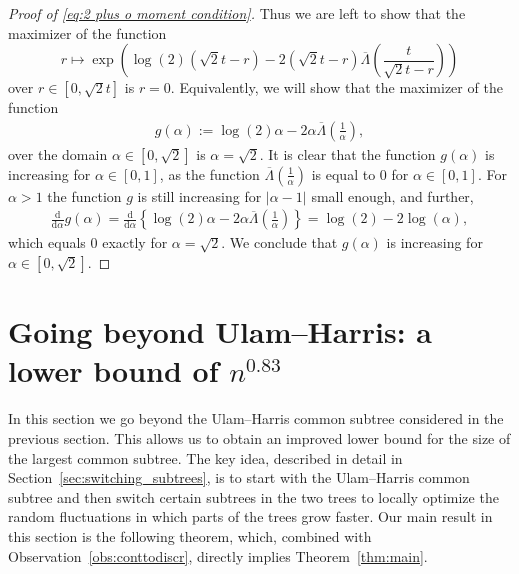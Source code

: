 \documentclass[11pt]{article}
\numberwithin{equation}{section}
\newcommand{\dd}{\mathrm d}
\theoremstyle{definition}
\begin{document}
\begin{proof}[Proof of \eqref{eq:2 plus o moment condition}]
Thus we are left to show that the maximizer of the function 
\[
r \mapsto    \exp \left( \log(2) (\sqrt{2}t-r) - 2 (\sqrt{2}t-r) \overline{\Lambda}\left( \frac{t}{\sqrt{2}t - r} \right) \right)
\] 
over $r \in \left[0,\sqrt{2}t\right]$ is $r = 0$.
Equivalently, we will show that the maximizer of the function 
    \begin{align*}
        g(\alpha) := \log(2) \alpha - 2 \alpha \overline{\Lambda}\left( \frac{1}{\alpha} \right) ,
    \end{align*}
    over the domain $\alpha \in \left[ 0, \sqrt{2} \right]$ is $\alpha = \sqrt{2}$. It is clear that the function $g(\alpha)$ is increasing for $\alpha \in [0,1]$, as the function $\overline{\Lambda}\left( \tfrac{1}{\alpha} \right) $ is equal to $0$ for $\alpha \in [0,1]$. For $\alpha > 1$ the function $g$ is still increasing for $|\alpha-1|$ small enough, and further,
    \begin{align*}
        \frac{\dd}{\dd \alpha}g(\alpha) = \frac{\dd}{\dd \alpha} \left\{ \log(2)\alpha -2 \alpha \overline{\Lambda} \left( \frac{1}{\alpha} \right) \right\}
        = \log(2) - 2 \log(\alpha),
    \end{align*}
    which equals $0$ exactly for $\alpha = \sqrt{2}$. We conclude that $g(\alpha)$ is increasing for $\alpha \in  \left[ 0, \sqrt{2} \right]$.
\end{proof}


\section{Going beyond 
Ulam--Harris: 
a lower bound of $n^{0.83}$}
\label{sec:beyondUH}



In this section we 
go beyond the Ulam--Harris common subtree 
considered in the previous section. This allows us to obtain an improved lower bound for the size of the largest common subtree. 
The key idea, described in detail in Section~\ref{sec:switching_subtrees}, is to start with the Ulam--Harris common subtree and then switch certain subtrees in the two trees to locally optimize the random fluctuations in which parts of the trees grow faster. 
Our main result in this section is the following theorem, which, combined with Observation~\ref{obs:conttodiscr}, directly implies Theorem~\ref{thm:main}.
\end{document}

